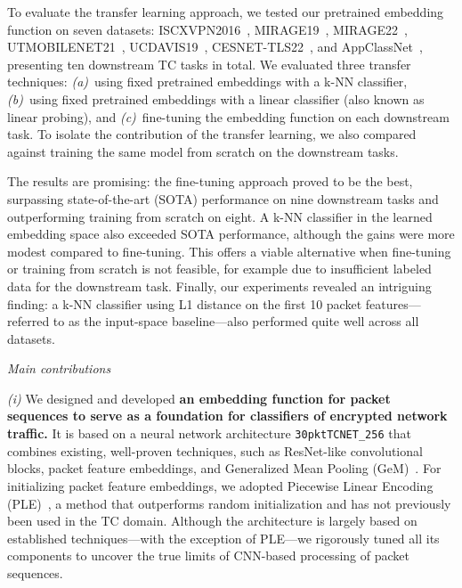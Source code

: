 \documentclass[lettersize,journal,twoside,article]{IEEEtran}
\begin{document}
To evaluate the transfer learning approach, we tested our pretrained embedding function on seven datasets: \mbox{ISCXVPN2016}~\cite{dataset_ISCXVPN2016}, MIRAGE19~\cite{dataset_MIRAGE19}, MIRAGE22~\cite{dataset_MIRAGE22}, UTMOBILENET21~\cite{dataset_UTMOBILENET21}, UCDAVIS19~\cite{dataset_UCDAVIS19}, CESNET-TLS22~\cite{Luxemburk2023TLS}, and AppClassNet~\cite{dataset_AppClassNet}, presenting ten downstream TC tasks in total. We evaluated three transfer techniques: \textit{(a)}~using fixed pretrained embeddings with a k-NN classifier, \textit{(b)}~using fixed pretrained embeddings with a linear classifier (also known as linear probing), and \textit{(c)}~fine-tuning the embedding function on each downstream task. To isolate the contribution of the transfer learning, we also compared against training the same model from scratch on the downstream tasks.


The results are promising: the fine-tuning approach proved to be the best, surpassing state-of-the-art (SOTA) performance on nine downstream tasks and outperforming training from scratch on eight. A k-NN classifier in the learned embedding space also exceeded SOTA performance, although the gains were more modest compared to fine-tuning. This offers a viable alternative when fine-tuning or training from scratch is not feasible, for example due to insufficient labeled data for the downstream task. Finally, our experiments revealed an intriguing finding: a k-NN classifier using L1 distance on the first 10 packet features---referred to as the input-space baseline---also performed quite well across all datasets.

\medskip
\noindent
\textit{Main contributions}

\textit{(i)} We designed and developed \textbf{an embedding function for packet sequences to serve as a foundation for classifiers of encrypted network traffic.} It is based on a neural network architecture \texttt{30pktTCNET\_256} that combines existing, well-proven techniques, such as ResNet-like convolutional blocks, packet feature embeddings, and Generalized Mean Pooling (GeM)~\cite{Radenovic2018GeM}. For initializing packet feature embeddings, we adopted Piecewise Linear Encoding (PLE)~\cite{gorishniy2022embeddings}, a method that outperforms random initialization and has not previously been used in the TC domain. Although the architecture is largely based on established techniques---with the exception of PLE---we rigorously tuned all its components to uncover the true limits of CNN-based processing of packet sequences.
\end{document}
